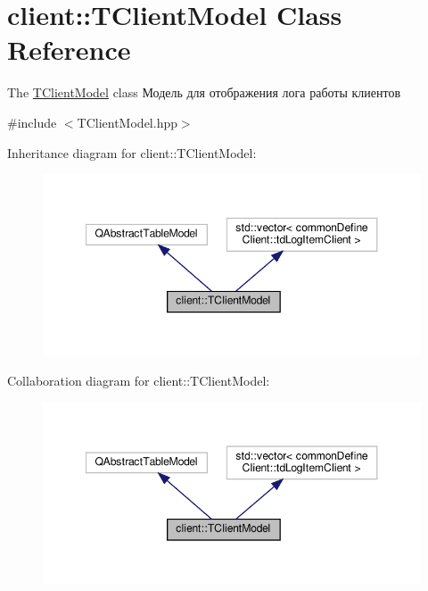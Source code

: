 \hypertarget{classclient_1_1_t_client_model}{}\section{client\+:\+:T\+Client\+Model Class Reference}
\label{classclient_1_1_t_client_model}


The \hyperlink{classclient_1_1_t_client_model}{T\+Client\+Model} class Модель для отображения лога работы клиентов  




{\ttfamily \#include $<$T\+Client\+Model.\+hpp$>$}



Inheritance diagram for client\+:\+:T\+Client\+Model\+:\nopagebreak
\begin{figure}[H]
\begin{center}
\leavevmode
\includegraphics[width=348pt]{classclient_1_1_t_client_model__inherit__graph}
\end{center}
\end{figure}


Collaboration diagram for client\+:\+:T\+Client\+Model\+:\nopagebreak
\begin{figure}[H]
\begin{center}
\leavevmode
\includegraphics[width=348pt]{classclient_1_1_t_client_model__coll__graph}
\end{center}
\end{figure}
